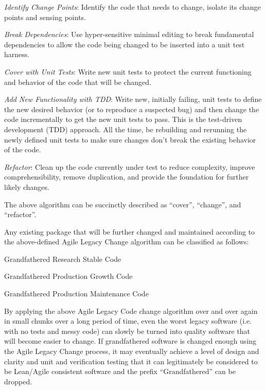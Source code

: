 \documentclass[11pt]{SANDreport}
\begin{document}
\begin{compactenum}

{}\item\textit{Identify Change Points}: Identify the code that needs to change, isolate its change points and sensing points.

{}\item\textit{Break Dependencies}: Use hyper-sensitive minimal editing to break fundamental dependencies to allow the code being changed to be inserted into a unit test harness.

{}\item\textit{Cover with Unit Tests}: Write new unit tests to protect the current functioning and behavior of the code that will be changed.

{}\item\textit{Add New Functionality with TDD}: Write new, initially failing, unit tests to define the new desired behavior (or to reproduce a suspected bug) and then change the code incrementally to get the new unit tests to pass.  This is the test-driven development (TDD) approach.  All the time, be rebuilding and rerunning the newly defined unit tests to make sure changes don't break the existing behavior of the code.

{}\item\textit{Refactor}: Clean up the code currently under test to reduce complexity, improve comprehensibility, remove duplication, and provide the foundation for further likely changes.

\end{compactenum}

The above algorithm can be succinctly described as ``cover'', ``change'', and
``refactor''.

Any existing package that will be further changed and maintained according to the above-defined Agile Legacy Change algorithm can be classified as follows:

\begin{compactenum}

{}\item Grandfathered Research Stable Code

{}\item Grandfathered Production Growth Code

{}\item Grandfathered Production Maintenance Code

\end{compactenum}

By applying the above Agile Legacy Code change algorithm over and over again in small chunks over a long period of time, even the worst legacy software (i.e. with no tests and messy code) can slowly be turned into quality software that will become easier to change.  If grandfathered software is changed enough using the Agile Legacy Change process, it may eventually achieve a level of design and clarity and unit and verification testing that it can legitimately be considered to be Lean/Agile consistent software and the prefix ``Grandfathered'' can be dropped.
\end{document}
